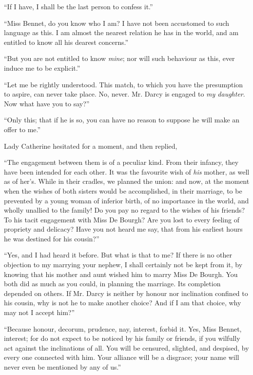 “If I have, I shall be the last person to confess it.”

“Miss Bennet, do you know who I am? I have not
been accustomed to such language as this. I am almost
the nearest relation he has in the world, and am entitled
to know all his dearest concerns.”

“But you are not entitled to know \textit{mine}; nor will
such behaviour as this, ever induce me to be explicit.”

“Let me be rightly understood. This match, to which
you have the presumption to aspire, can never take place.
No, never. Mr. Darcy is engaged to \textit{my daughter}. Now
what have you to say?”

“Only this; that if he is so, you can have no reason
to suppose he will make an offer to me.”

Lady Catherine hesitated for a moment, and then
replied,

“The engagement between them is of a peculiar kind.
From their infancy, they have been intended for each
other. It was the favourite wish of \textit{his} mother, as well
as of her’s. While in their cradles, we planned the union:
and now, at the moment when the wishes of both sisters
would be accomplished, in their marriage, to be prevented
by a young woman of inferior birth, of no importance in
the world, and wholly unallied to the family! Do you
pay no regard to the wishes of his friends? To his tacit
engagement with Miss De Bourgh? Are you lost to every
feeling of propriety and delicacy? Have you not heard
me say, that from his earliest hours he was destined for
his cousin?”

“Yes, and I had heard it before. But what is that
to me? If there is no other objection to my marrying your
nephew, I shall certainly not be kept from it, by knowing
that his mother and aunt wished him to marry Miss
De Bourgh. You both did as much as you could, in planning
the marriage. Its completion depended on others.
If Mr. Darcy is neither by honour nor inclination confined
to his cousin, why is not he to make another choice? And
if I am that choice, why may not I accept him?”

“Because honour, decorum, prudence, nay, interest,
forbid it. Yes, Miss Bennet, interest; for do not expect
to be noticed by his family or friends, if you wilfully act
against the inclinations of all. You will be censured,
slighted, and despised, by every one connected with him.
Your alliance will be a disgrace; your name will never
even be mentioned by any of us.”

